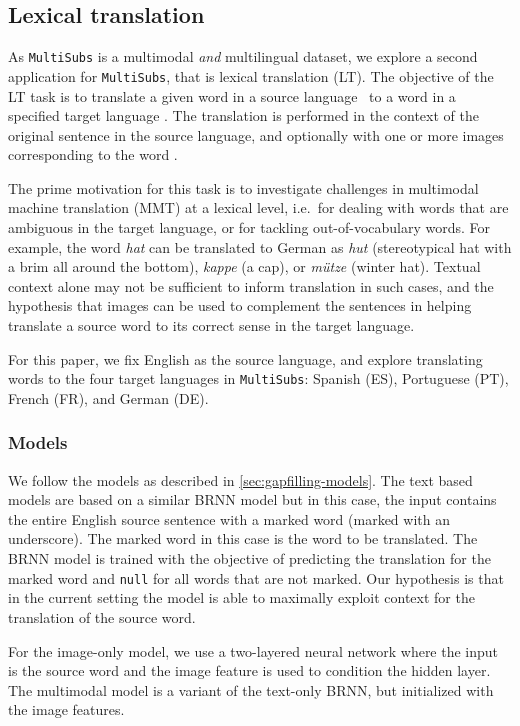 \documentclass[twocolumn]{svjour3}          \smartqed  \usepackage{graphicx}
\newcommand{\multisubs}{\texttt{MultiSubs}\xspace}
\begin{document}
\subsection{Lexical translation}
\label{sec:mlt}

As \multisubs is a multimodal \emph{and} multilingual dataset, we explore a second application for \multisubs, that is lexical translation (LT). The objective of the LT task is to translate a given word  in a source language~ to a word  in a specified target language . The translation is performed in the context of the original sentence in the source language, and optionally with one or more images corresponding to the word . 

The prime motivation for this task is to investigate challenges in multimodal machine translation (MMT) at a lexical level, i.e.\ for dealing with words that are ambiguous in the target language, or for tackling out-of-vocabulary words. For example, the word \textit{hat} can be translated to German as \textit{hut} (stereotypical hat with a brim all around the bottom), \textit{kappe} (a cap), or \textit{m{\"u}tze} (winter hat). Textual context alone may not be sufficient to inform translation in such cases, and the hypothesis that images can be used to complement the sentences in helping translate a source word to its correct sense in the target language.

For this paper, we fix English as the source language, and explore translating words to the four target languages in \multisubs: Spanish (ES), Portuguese (PT), French (FR), and German (DE). 

\subsubsection{Models}
\label{sec:mlt-models}
We follow the models as described in \ref{sec:gapfilling-models}. The text based models are based on a similar BRNN model but in this case, the input contains the entire English source sentence with a marked word (marked with an underscore). The marked word in this case is the word to be translated. The BRNN model is trained with the objective of predicting the translation for the marked word and \texttt{null} for all words that are not marked. Our hypothesis is that in the current setting the model is able to maximally exploit context for the translation of the source word. 

For the image-only model, we use a two-layered neural network where the input is the source word and the image feature is used to condition the hidden layer. 
The multimodal model is a variant of the text-only BRNN, but initialized with the image features.
\end{document}
